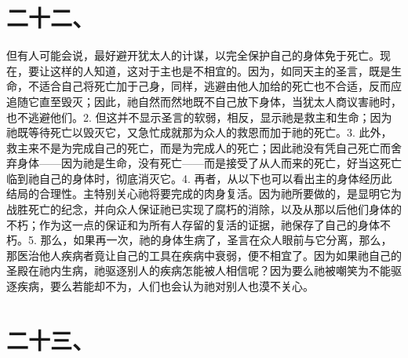 
\section{二十二、}

但有人可能会说，最好避开犹太人的计谋，以完全保护自己的身体免于死亡。现在，要让这样的人知道，这对于主也是不相宜的。因为，如同天主的圣言，既是生命，不适合自己将死亡加于己身，同样，逃避由他人加给的死亡也不合适，反而应追随它直至毁灭；因此，祂自然而然地既不自己放下身体，当犹太人商议害祂时，也不逃避他们。\newline{}2. 但这并不显示圣言的软弱，相反，显示祂是救主和生命；因为祂既等待死亡以毁灭它，又急忙成就那为众人的救恩而加于祂的死亡。\newline{}3. 此外，救主来不是为完成自己的死亡，而是为完成人的死亡；因此祂没有凭自己死亡而舍弃身体——因为祂是生命，没有死亡——而是接受了从人而来的死亡，好当这死亡临到祂自己的身体时，彻底消灭它。\newline{}4. 再者，从以下也可以看出主的身体经历此结局的合理性。主特别关心祂将要完成的肉身复活。因为祂所要做的，是显明它为战胜死亡的纪念，并向众人保证祂已实现了腐朽的消除，以及从那以后他们身体的不朽；作为这一点的保证和为所有人存留的复活的证据，祂保存了自己的身体不朽。\newline{}5. 那么，如果再一次，祂的身体生病了，圣言在众人眼前与它分离，那么，那医治他人疾病者竟让自己的工具在疾病中衰弱，便不相宜了。因为如果祂自己的圣殿在祂内生病，祂驱逐别人的疾病怎能被人相信呢？因为要么祂被嘲笑为不能驱逐疾病，要么若能却不为，人们也会认为祂对别人也漠不关心。\par


\section{二十三、}

